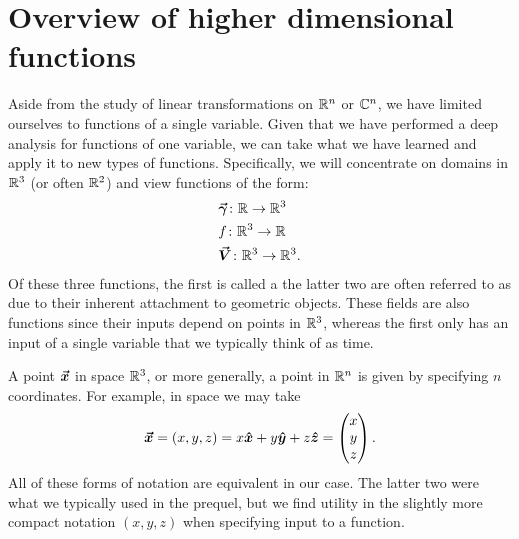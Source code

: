         \section{Overview of higher dimensional functions}
        Aside from the study of linear transformations on $\mathbb{R}^n$ or $\mathbb{C}^n$, we have limited ourselves to functions of a single variable.  Given that we have performed a deep analysis for functions of one variable, we can take what we have learned and apply it to new types of functions. Specifically, we will concentrate on domains in $\mathbb{R}^3$ (or often $\mathbb{R}^2$) and view functions of the form:
        \begin{align*}
            &\boldsymbol{\vec{\gamma}}\colon \mathbb{R} \to \mathbb{R}^3\\
            &f\colon \mathbb{R}^3 \to \mathbb{R}\\
            &\boldsymbol{\vec{V}} \colon \mathbb{R}^3 \to \mathbb{R}^3.
        \end{align*}
        Of these three functions, the first is called a   the latter two are often referred to as   due to their inherent attachment to geometric objects.  These fields are also  functions since their inputs depend on points in $\mathbb{R}^3$, whereas the first only has an input of a single variable that we typically think of as time.
        
        A point $\boldsymbol{\boldsymbol{\vec{x}}}$ in space $\mathbb{R}^3$, or more generally, a point in $\mathbb{R}^n$ is given by specifying $n$ coordinates. For example, in space we may take
        \[
        \boldsymbol{\boldsymbol{\vec{x}}} = (x,y,z) = x\boldsymbol{\hat{x}} + y\boldsymbol{\hat{y}} + z\boldsymbol{\hat{z}} = \begin{pmatrix} x \\ y \\ z \end{pmatrix}.
        \]
        All of these forms of notation are equivalent in our case. The latter two were what we typically used in the prequel, but we find utility in the slightly more compact notation $(x,y,z)$ when specifying input to a function. 
        

